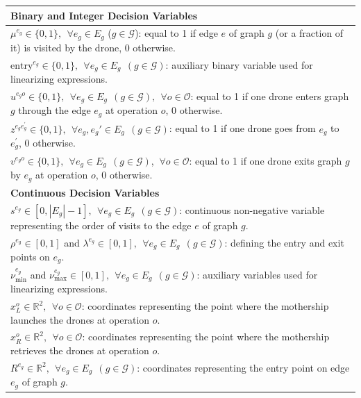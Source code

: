 \documentclass[10pt,a4paper]{elsarticle}
\newcommand{\EN}[1]{{\color{black}#1}}
\begin{document}
\begin{table}[h!]
\scriptsize
\centering
\begin{tabular}{|l|}
	\hline 
	\textbf{Binary and Integer Decision Variables}\\
	\hline
	$\mu^{e_g} \in \{0,1\}, \:\: \forall e_g \in E_g$ ($g \in \mathcal{G}$): equal to 1 if edge $e$ of graph $g$ (or a fraction of it) is visited by the drone, 0 otherwise.\\
	$\text{entry}^{e_g} \in \{0,1\}, \:\: \forall e_g \in E_g \:\: (g \in \mathcal{G})$: auxiliary binary variable used for linearizing expressions.\\
	$u^{e_{g}o} \in \{0,1\}, \:\: \forall e_g \in E_g \:\: (g \in \mathcal{G}), \:\: \forall o \in \mathcal O$: equal to 1 if one drone enters graph $g$ \EN{through} the edge $e_g$ at operation $o$, 0 otherwise.\\
	$z^{e_{g}e^{'}_{g}} \in \{0,1\}, \:\: \forall e_g, e_g' \in E_g\:\: (g \in \mathcal{G})$: equal to 1 if one drone goes from $e_g$ to $e^{'}_{g}$, 0 otherwise.\\
	$v^{e_{g}o} \in \{0,1\}, \:\: \forall e_g \in E_g \:\: (g \in \mathcal{G})$, $\: \forall o \in \mathcal O$: equal to 1 if one drone exits graph $g$ by $e_g$ at operation $o$, 0 otherwise.\\
	\hline
	\textbf{Continuous Decision Variables}\\
	\hline
	$s^{e_g} \in [0,|E_g|-1], \:\: \forall e_g \in E_g \:\: (g \in \mathcal{G})$: continuous non\EN{-}negative variable representing the order of visit\EN{s to} the edge $e$ of graph $g$.\\
	$\rho^{e_g} \in [0,1]$ and $\lambda^{e_g} \in [0,1], \:\: \forall e_g \in E_g \:\: (g \in \mathcal{G})$: defining the entry and exit points on $e_g$.\\
	$\nu_\text{min}^{e_g}$ and $\nu_\text{max}^{e_g} \in [0,1], \:\: \forall e_g \in E_g \:\: (g \in \mathcal{G})$: auxiliary variables used for linearizing expressions.\\
	$x_L^o\in\mathbb R^2, \:\: \forall o \in \mathcal O$: coordinates representing the point where the mothership launches the drones at operation $o$.\\
	$x_R^o\in\mathbb R^2, \:\: \forall o \in \mathcal O$: coordinates representing the point where the mothership retrieves the drones at operation $o$.\\
	$R^{e_g}\in\mathbb R^2, \:\: \forall e_g \in E_g \:\: (g \in \mathcal{G})$: coordinates representing the entry point on edge $e_g$ of graph $g$.\\

\end{tabular}
\end{table}
\end{document}
